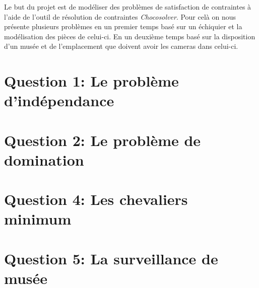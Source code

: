 \documentclass[letterpaper]{article}
\begin{document}
Le but du projet est de modéliser des problèmes de satisfaction de contraintes
à l'aide de l'outil de résolution de contraintes \emph{Chocosolver}. Pour celà
on nous présente plusieurs problèmes en un premier temps basé sur un échiquier
et la modélisation des pièces de celui-ci. En un deuxième temps basé sur la
disposition d'un musée et de l'emplacement que doivent avoir les cameras dans
celui-ci.

\section{Question 1: Le problème d'indépendance}
\section{Question 2: Le problème de domination}
\section{Question 4: Les chevaliers minimum}
\section{Question 5: La surveillance de musée}
\end{document}
